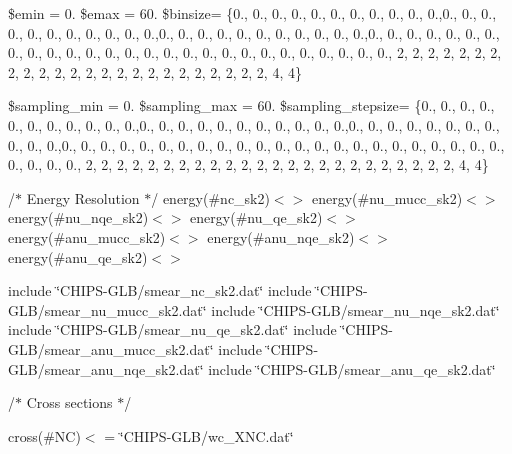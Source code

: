 \$emin = 0. \$emax = 60. \$binsize= \{0., 0., 0., 0., 0., 0., 0., 0., 0., 0., 0.,0., 0., 0., 0., 0., 0., 0., 0., 0., 0., 0.,0., 0., 0., 0., 0., 0., 0., 0., 0., 0., 0.,0., 0., 0., 0., 0., 0., 0., 0., 0., 0., 0., 0., 0., 0., 0., 0., 0., 0., 0., 0., 0., 0., 0., 0., 0., 0., 0., 2, 2, 2, 2, 2, 2, 2, 2, 2, 2, 2, 2, 2, 2, 2, 2, 2, 2, 2, 2, 2, 2, 2, 2, 4, 4\}

\$sampling\+\_\+min = 0. \$sampling\+\_\+max = 60. \$sampling\+\_\+stepsize= \{0., 0., 0., 0., 0., 0., 0., 0., 0., 0., 0.,0., 0., 0., 0., 0., 0., 0., 0., 0., 0., 0.,0., 0., 0., 0., 0., 0., 0., 0., 0., 0., 0.,0., 0., 0., 0., 0., 0., 0., 0., 0., 0., 0., 0., 0., 0., 0., 0., 0., 0., 0., 0., 0., 0., 0., 0., 0., 0., 0., 2, 2, 2, 2, 2, 2, 2, 2, 2, 2, 2, 2, 2, 2, 2, 2, 2, 2, 2, 2, 2, 2, 2, 2, 4, 4\}

/$\ast$ Energy Resolution $\ast$/ energy(\#nc\+\_\+sk2)$<$$>$ energy(\#nu\+\_\+mucc\+\_\+sk2)$<$$>$ energy(\#nu\+\_\+nqe\+\_\+sk2)$<$$>$ energy(\#nu\+\_\+qe\+\_\+sk2)$<$$>$ energy(\#anu\+\_\+mucc\+\_\+sk2)$<$$>$ energy(\#anu\+\_\+nqe\+\_\+sk2)$<$$>$ energy(\#anu\+\_\+qe\+\_\+sk2)$<$$>$

include \char`\"{}\+C\+H\+I\+P\+S-\/\+G\+L\+B/smear\+\_\+nc\+\_\+sk2.\+dat\char`\"{} include \char`\"{}\+C\+H\+I\+P\+S-\/\+G\+L\+B/smear\+\_\+nu\+\_\+mucc\+\_\+sk2.\+dat\char`\"{} include \char`\"{}\+C\+H\+I\+P\+S-\/\+G\+L\+B/smear\+\_\+nu\+\_\+nqe\+\_\+sk2.\+dat\char`\"{} include \char`\"{}\+C\+H\+I\+P\+S-\/\+G\+L\+B/smear\+\_\+nu\+\_\+qe\+\_\+sk2.\+dat\char`\"{} include \char`\"{}\+C\+H\+I\+P\+S-\/\+G\+L\+B/smear\+\_\+anu\+\_\+mucc\+\_\+sk2.\+dat\char`\"{} include \char`\"{}\+C\+H\+I\+P\+S-\/\+G\+L\+B/smear\+\_\+anu\+\_\+nqe\+\_\+sk2.\+dat\char`\"{} include \char`\"{}\+C\+H\+I\+P\+S-\/\+G\+L\+B/smear\+\_\+anu\+\_\+qe\+\_\+sk2.\+dat\char`\"{}

/$\ast$ Cross sections $\ast$/

cross(\#\+NC)$<$  = \char`\"{}\+C\+H\+I\+P\+S-\/\+G\+L\+B/wc\+\_\+\+X\+N\+C.\+dat\char`\"{} \begin{quote}


\end{quote}


